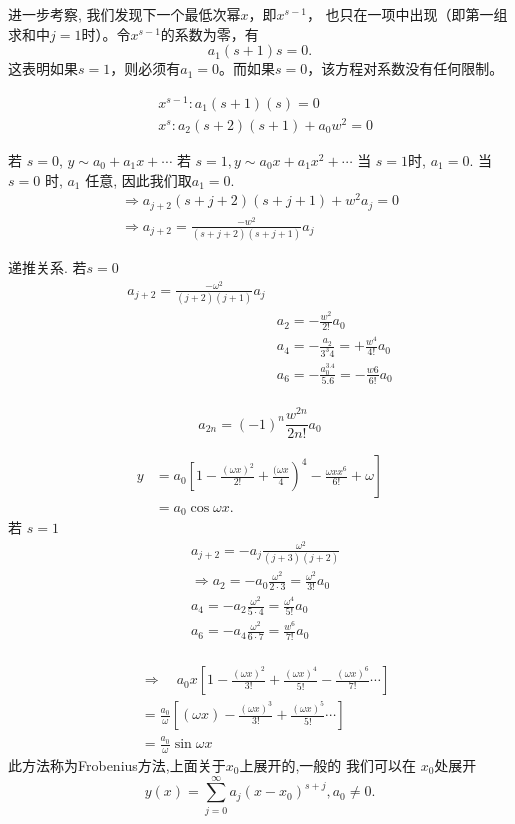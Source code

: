 进一步考察, 我们发现下一个最低次幂$x$，即$x^{s-1}$，
也只在一项中出现（即第一组求和中$j=1$时）。令$x^{s-1}$的系数为零，有
$$
a_1(s+1)s=0 .
$$
这表明如果$s=1$，则必须有$a_1=0$。而如果$s=0$，该方程对系数没有任何限制。

$$
\begin{aligned}
& x^{s-1}: a_1(s+1)(s)=0 \\
& x^s: a_2(s+2)(s+1)+a_0 w^2=0
\end{aligned}
$$

若 $s=0$, $y \sim  a_0+a_1 x+\cdots$
若 $s=1, y \sim a_0 x+a_1 x^2+\cdots$
当 $s=1$时, $a_1=0$.
当 $s=0$ 时, $a_1$ 任意, 因此我们取$a_1=0$.
$$
\begin{gathered}
\Rightarrow a_{j+2}(s+j+2)(s+j+1)+w^2 a_j=0 \\
\Rightarrow a_{j+2}=\frac{-w^2}{(s+j+2)(s+j+1)} a_j
\end{gathered}
$$

递推关系.
若$s=0$ 
$$
\begin{aligned}
a_{j+2}=\frac{-\omega^2}{(j+2)(j+1)} a_j \\
& a_2=-\frac{w^2}{2 !} a_0 \\
& a_4=-\frac{a_2}{3^3 4}=+\frac{w^4}{4 !} a_0 \\
& a_6=-\frac{a_0^{3.4}}{5.6}=-\frac{w 6}{6 !} a_0 \\
&
\end{aligned}
$$

$$
a_{2 n}=(-1)^n \frac{w^{2 n}}{2 n !} a_0
$$

$$
\begin{aligned}
y & \left.=a_0\left[1-\frac{(\omega x)^2}{2 !}+\frac{(\omega x}{4}\right)^4-\frac{\omega x x^6}{6 !}+\omega\right] \\
& =a_0 \cos \omega x .
\end{aligned}
$$
若 $s=1$ 
$$
\begin{aligned}
& a_{j+2}=-a_j \frac{\omega^2}{(j+3) (j+2)} \\
& \Rightarrow a_2=-a_0 \frac{\omega^2}{2 \cdot 3}=\frac{\omega^2}{3 !} a_0 \\
& a_4=-a_2 \frac{\omega^2}{5 \cdot 4}=\frac{\omega^4}{5 !} a_0 \\
& a_6=-a_4 \frac{\omega^2}{6\cdot 7}=\frac{w^6}{7 !} a_0 \\
\end{aligned}
$$

$$
\begin{aligned}
& \Rightarrow \quad a_0 x\left[1-\frac{(\omega x)^2}{3 !}+\frac{(\omega x)^{4}}{5 !}-\frac{(\omega x)^6}{7 !} \cdots\right] \\
& =\frac{a_0}{\omega}\left[(\omega x)-\frac{(\omega x)^3}{3 !}+\frac{(\omega x)^5}{5 !} \cdots\right] \\
& =\frac{a_0}{\omega} \sin \omega x
\end{aligned}
$$
此方法称为Frobenius方法,上面关于$x_0$上展开的,一般的
我们可以在 $x_0$处展开
$$
y(x)=\sum_{j=0}^{\infty} a_j\left(x-x_0\right)^{s+j}, a_0 \neq 0 .
$$


